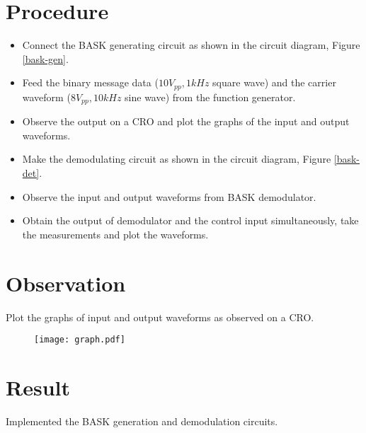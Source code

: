 \section*{Procedure}
\begin{itemize}
\item
Connect the BASK generating circuit as shown in the circuit diagram, Figure \ref{bask-gen}.
\item
Feed the binary message data ($10 V_{pp}, 1 kHz$ square wave) and the carrier waveform  ($8 V_{pp}, 10 kHz$ sine wave) from the function generator.
\item
Observe the output on a CRO and plot the graphs of the input and output waveforms.
\item
Make the demodulating circuit as shown in the circuit diagram, Figure \ref{bask-det}.
\item
Observe the input and output waveforms from BASK demodulator.
\item 
Obtain the output of demodulator and the control input simultaneously, take the measurements and plot the waveforms.

\end{itemize}
\section*{Observation}
Plot the graphs of input and output waveforms as observed on a CRO.


\begin{figure}
	\texttt{[image: graph.pdf]}
\end{figure}

\section*{Result}

Implemented the BASK generation and demodulation circuits.